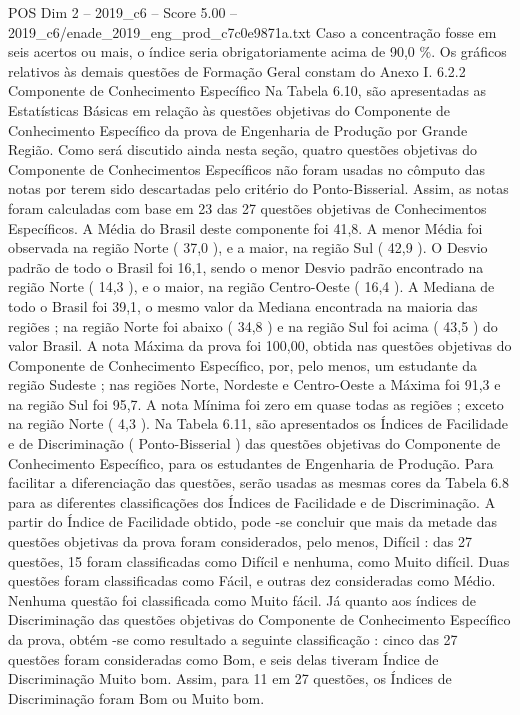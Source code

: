 \begin{textsample}{POS Dim 2 – 2019\_c6 – Score 5.00 – 2019\_c6/enade\_2019\_eng\_prod\_c7c0e9871a.txt}
Caso a concentração fosse em seis acertos ou mais, o índice seria obrigatoriamente acima de 90,0 \%.
Os gráficos relativos às demais questões de Formação Geral constam do Anexo I. 6.2.2 Componente de Conhecimento Específico Na Tabela 6.10, são apresentadas as Estatísticas Básicas em relação às questões objetivas do Componente de Conhecimento Específico da prova de Engenharia de Produção por Grande Região.
Como será discutido ainda nesta seção, quatro questões objetivas do Componente de Conhecimentos Específicos não foram usadas no cômputo das notas por terem sido descartadas pelo critério do Ponto-Bisserial.
Assim, as notas foram calculadas com base em 23 das 27 questões objetivas de Conhecimentos Específicos.
A Média do Brasil deste componente foi 41,8.
A menor Média foi observada na região Norte ( 37,0 ), e a maior, na região Sul ( 42,9 ).
O Desvio padrão de todo o Brasil foi 16,1, sendo o menor Desvio padrão encontrado na região Norte ( 14,3 ), e o maior, na região Centro-Oeste ( 16,4 ).
A Mediana de todo o Brasil foi 39,1, o mesmo valor da Mediana encontrada na maioria das regiões ; na região Norte foi abaixo ( 34,8 ) e na região Sul foi acima ( 43,5 ) do valor Brasil.
A nota Máxima da prova foi 100,00, obtida nas questões objetivas do Componente de Conhecimento Específico, por, pelo menos, um estudante da região Sudeste ; nas regiões Norte, Nordeste e Centro-Oeste a Máxima foi 91,3 e na região Sul foi 95,7.
A nota Mínima foi zero em quase todas as regiões ; exceto na região Norte ( 4,3 ).
Na Tabela 6.11, são apresentados os Índices de Facilidade e de Discriminação ( Ponto-Bisserial ) das questões objetivas do Componente de Conhecimento Específico, para os estudantes de Engenharia de Produção.
Para facilitar a diferenciação das questões, serão usadas as mesmas cores da Tabela 6.8 para as diferentes classificações dos Índices de Facilidade e de Discriminação.
A partir do Índice de Facilidade obtido, pode -se concluir que mais da metade das questões objetivas da prova foram considerados, pelo menos, Difícil : das 27 questões, 15 foram classificadas como Difícil e nenhuma, como Muito difícil.
Duas questões foram classificadas como Fácil, e outras dez consideradas como Médio.
Nenhuma questão foi classificada como Muito fácil.
Já quanto aos índices de Discriminação das questões objetivas do Componente de Conhecimento Específico da prova, obtém -se como resultado a seguinte classificação : cinco das 27 questões foram consideradas como Bom, e seis delas tiveram Índice de Discriminação Muito bom.
Assim, para 11 em 27 questões, os Índices de Discriminação foram Bom ou Muito bom.

\end{textsample}
